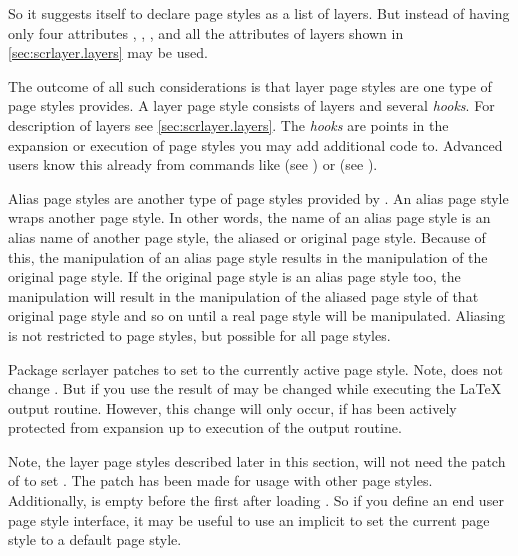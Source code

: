 So it suggests itself to declare page styles as a list of layers. But instead of
having only four attributes , ,
, and  all the attributes of layers
shown in \autoref{sec:scrlayer.layers} may be used.

The outcome of all such considerations is that layer page styles are one type
of page styles  provides. A layer page style consists of
layers and several \emph{hooks}. For description of layers see
\autoref{sec:scrlayer.layers}.  The \emph{hooks} are points in the expansion
or execution of page styles you may add additional code to. Advanced users
know this already from commands like  (see
\cite{latex:usrguide}) or  (see
).

Alias page styles are another type of page styles provided by
. An alias page style wraps another page style. In other
words, the name of an alias page style is an alias name of another page style,
the aliased or original page style. Because of this, the manipulation of an
alias page style results in the manipulation of the original page style. If
the original page style is an alias page style too, the manipulation will
result in the manipulation of the aliased page style of that original page
style and so on until a real page style will be manipulated. Aliasing is not
restricted to  page styles, but possible for all page
styles.

\begin{Declaration}
\end{Declaration}
%
Package scrlayer patches  to set  to
the currently active page style. Note,  does not change
. But if you use  the result of
 may be changed while executing the \LaTeX{} output
routine. However, this change will only occur, if  has
been actively protected from expansion up to execution of the output routine.

Note, the layer page styles described later in this section, will not need
the patch of  to set . The patch has
been made for usage with other page styles. Additionally, 
 is empty before the first  after
loading . So if you define an end user page style interface,
it may be useful to use an implicit  to set the current page
style to a default page style.%

